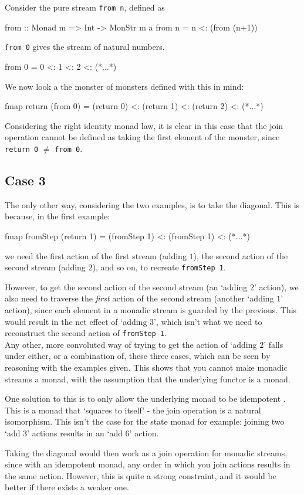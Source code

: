 Consider the pure stream \verb+from n+, defined as
\begin{haskell}
from :: Monad m => Int -> MonStr m a 
from n = n <: (from (n+1))
\end{haskell}

\verb+from 0+ gives the stream of natural numbers.
\begin{haskell}
from 0 = 0 <: 1 <: 2 <: (*...*)
\end{haskell}

We now look a the monster of monsters defined with this in mind:
\begin{haskell}
fmap return (from 0) = (return 0) <: (return 1) <: (return 2) <: (*...*)
\end{haskell}

Considering the right identity monad law, it is clear in this case that the join operation cannot be defined as taking the first element of the monster, since \verb+return 0+ $\neq$ \verb+from 0+.

\subsection{Case 3}

The only other way, considering the two examples, is to take the diagonal. This is because, in the first example:
\begin{haskell}
fmap fromStep (return 1) = (fromStep 1) <: (fromStep 1) <: (*...*)
\end{haskell}
we need the first action of the first stream (adding $1$), the second action of the second stream (adding $2$), and so on, to recreate  \verb+fromStep 1+.

However, to get the second action of the second stream (an `adding $2$' action), we also need to traverse the \emph {first} action of the second stream (another `adding $1$' action), since each element in a monadic stream is guarded by the previous. This would result in the net effect of `adding $3$', which isn't what we need to reconstruct the second action of \verb+fromStep 1+. \\

Any other, more convoluted way of trying to get the action of `adding $2$' falls under either, or a combination of, these three cases, which can be seen by reasoning with the examples given. This shows that you cannot make monadic streams a monad, with the assumption that the underlying functor is a monad.

One solution to this is to only allow the underlying monad to be idempotent \cite{idempotent_monads}. This is a monad that `squares to itself' - the join operation is a natural isomorphism. This isn't the case for the state monad for example: joining two `add 3' actions results in an `add 6' action.

Taking the diagonal would then work as a join operation for monadic streams, since with an idempotent monad, any order in which you join actions results in the same action. However, this is quite a strong constraint, and it would be better if there exists a weaker one.



